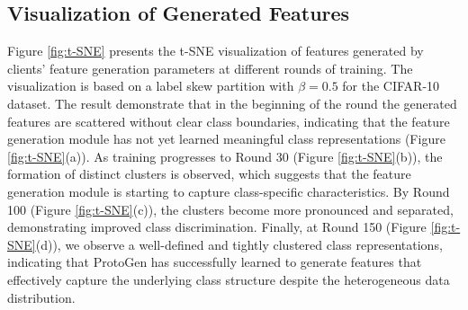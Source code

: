 \documentclass[lettersize,journal]{IEEEtran}
\begin{document}
\subsection{Visualization of Generated Features}
Figure \ref{fig:t-SNE} presents the t-SNE visualization of features generated by clients' feature generation parameters at different rounds of training. The visualization is based on a label skew partition with $\beta = 0.5$ for the CIFAR-10 dataset.
The result demonstrate that in the beginning of the round the generated features are scattered without clear class boundaries, indicating that the feature generation module has not yet learned meaningful class representations (Figure \ref{fig:t-SNE}(a)). As training progresses to Round 30 (Figure \ref{fig:t-SNE}(b)), the formation of distinct clusters is observed, which suggests that the feature generation module is starting to capture class-specific characteristics.
By Round 100 (Figure \ref{fig:t-SNE}(c)), the clusters become more pronounced and separated, demonstrating improved class discrimination. Finally, at Round 150 (Figure \ref{fig:t-SNE}(d)), we observe a well-defined and tightly clustered class representations, indicating that \textsf{ProtoGen} has successfully learned to generate features that effectively capture the underlying class structure despite the heterogeneous data distribution.


\end{document}
